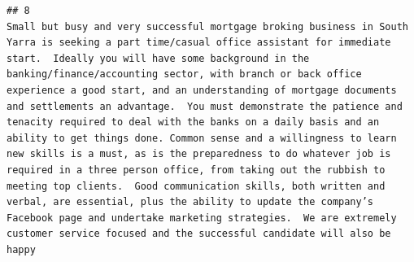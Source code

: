 \documentclass[11pt,a4paper,]{article}
\begin{document}
\begin{verbatim}
## 8                                                                                                                                                                                                                                                                                                                                                                                                                                                                                                                                                                                                                                                                                                                                                                                                                                                                                                                                                                                                                                                                                                                                                                                                                                                                                                                                                                                                                                                                                                                                                                                                                                                                                                                                                                                                                                                                                                                                                                                                                                                                                                                                                                                                                                                                                                                                                                                                                                                                                   Small but busy and very successful mortgage broking business in South Yarra is seeking a part time/casual office assistant for immediate start.  Ideally you will have some background in the banking/finance/accounting sector, with branch or back office experience a good start, and an understanding of mortgage documents and settlements an advantage.  You must demonstrate the patience and tenacity required to deal with the banks on a daily basis and an ability to get things done. Common sense and a willingness to learn new skills is a must, as is the preparedness to do whatever job is required in a three person office, from taking out the rubbish to meeting top clients.  Good communication skills, both written and verbal, are essential, plus the ability to update the company’s Facebook page and undertake marketing strategies.  We are extremely customer service focused and the successful candidate will also be happy 
\end{verbatim}
\end{document}
